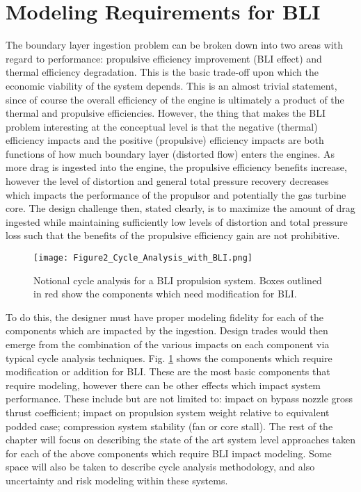 \section{Modeling Requirements for BLI}
The boundary layer ingestion problem can be broken down into two areas with regard to performance:  propulsive efficiency improvement (BLI effect) and thermal efficiency degradation.  This is the basic trade-off upon which the economic viability of the system depends.  This is an almost trivial statement, since of course the overall efficiency of the engine is ultimately a product of the thermal and propulsive efficiencies.  However, the thing that makes the BLI problem interesting at the conceptual level is that the negative (thermal) efficiency impacts and the positive (propulsive) efficiency impacts are both functions of how much boundary layer (distorted flow) enters the engines.  As more drag is ingested into the engine, the propulsive efficiency benefits increase, however the level of distortion and general total pressure recovery decreases which impacts the performance of the propulsor and potentially the gas turbine core.  The design challenge then, stated clearly, is to maximize the amount of drag ingested while maintaining sufficiently low levels of distortion and total pressure loss such that the benefits of the propulsive efficiency gain are not prohibitive.  
\begin{figure}[htpb]
\centering
\texttt{[image: Figure2\_Cycle\_Analysis\_with\_BLI.png]}
\caption{Notional cycle analysis for a BLI propulsion system.  Boxes outlined in red show the components which need modification for BLI.}
\label{BLI_changes}
\end{figure}
To do this, the designer must have proper modeling fidelity for each of the components which are impacted by the ingestion.  Design trades would then emerge from the combination of the various impacts on each component via typical cycle analysis techniques.  Fig. \ref{BLI_changes} shows the components which require modification or addition for BLI.  These are the most basic components that require modeling, however there can be other effects which impact system performance.  These include but are not limited to: impact on bypass nozzle gross thrust coefficient; impact on propulsion system weight relative to equivalent podded case; compression system stability (fan or core stall).
	The rest of the chapter will focus on describing the state of the art system level approaches taken for each of the above components which require BLI impact modeling.  Some space will also be taken to describe cycle analysis methodology, and also uncertainty and risk modeling within these systems.   

